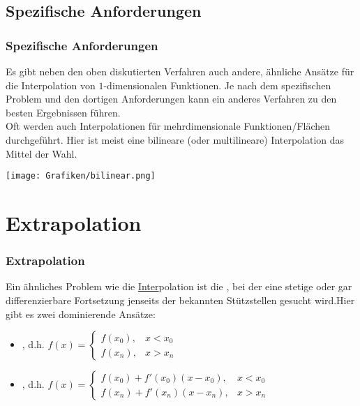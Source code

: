 \subsection{Spezifische Anforderungen}
%
\begin{frame}\frametitle{Spezifische Anforderungen}
Es gibt neben den oben diskutierten Verfahren auch andere, ähnliche Ansätze für die Interpolation von $1$-dimensionalen Funktionen. Je nach dem spezifischen Problem und den dortigen Anforderungen kann ein anderes Verfahren zu den besten Ergebnissen führen.\\\vfill
Oft werden auch Interpolationen für mehrdimensionale Funktionen/Flächen durchgeführt. Hier ist meist eine bilineare (oder multilineare) Interpolation das Mittel der Wahl.
\begin{center}
\texttt{[image: Grafiken/bilinear.png]}
\end{center}	
\end{frame}

\section{Extrapolation}
\makeSectionDividerPage
\begin{frame}\frametitle{Extrapolation}
Ein ähnliches Problem wie die \underline{Inter}polation ist die , bei der eine stetige oder gar differenzierbare Fortsetzung jenseits der bekannten Stützstellen gesucht wird.\pause Hier gibt es zwei dominierende Ansätze:\vfill
\begin{itemize}
\item {}, d.h. $f(x)=\begin{cases}f(x_0), & x<x_0\\ f(x_n),& x>x_n \end{cases}$ \\\vfill
\item {}, d.h. $f(x)=\begin{cases}f(x_0)+f'(x_0)(x-x_0), & x<x_0\\ f(x_n)+f'(x_n)(x-x_n),& x>x_n \end{cases}$
\end{itemize}
\end{frame}



